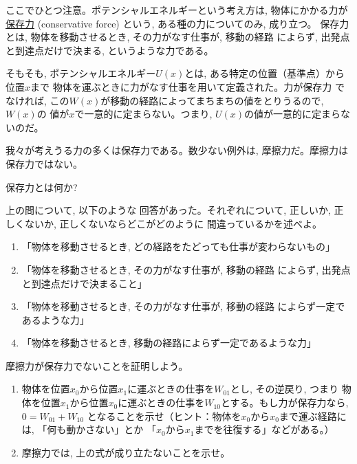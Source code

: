 ここでひとつ注意。ポテンシャルエネルギーという考え方は, 物体にかかる力が
\underline{保存力} (conservative force)
という, ある種の力についてのみ, 成り立つ。
保存力とは, 物体を移動させるとき, その力がなす仕事が, 移動の経路
によらず, 出発点と到達点だけで決まる, というような力である。

そもそも, ポテンシャルエネルギー$U(x)$とは, ある特定の位置（基準点）から位置$x$まで
物体を運ぶときに力がなす仕事を用いて定義された。力が保存力
でなければ, この$W(x)$が移動の経路によってまちまちの値をとりうるので, $W(x)$の
値が$x$で一意的に定まらない。つまり, $U(x)$の値が一意的に定まらないのだ。

我々が考えうる力の多くは保存力である。数少ない例外は, 摩擦力だ。摩擦力は保存力ではない。
\mv

%
\begin{q}\label{q:conservative_force}
保存力とは何か? 
\end{q}
\mv

\begin{q}\label{q:NewtonLaw_mistake} 上の問について, 以下のような
回答があった。それぞれについて, 正しいか, 正しくないか, 正しくないならどこがどのように
間違っているかを述べよ。
\begin{enumerate}
\item 「物体を移動させるとき, どの経路をたどっても仕事が変わらないもの」
\item 「物体を移動させるとき, その力がなす仕事が, 移動の経路
によらず, 出発点と到達点だけで決まること」
\item 「物体を移動させるとき, その力がなす仕事が, 移動の経路
によらず一定であるような力」
\item 「物体を移動させるとき, 移動の経路によらず一定であるような力」
\end{enumerate}
\end{q}


%
\begin{q}\label{q:friction_non_conservative}
摩擦力が保存力でないことを証明しよう。
\begin{enumerate}
\item 物体を位置$x_0$から位置$x_1$に運ぶときの仕事を$W_{01}$とし, その逆戻り, つまり
物体を位置$x_1$から位置$x_0$に運ぶときの仕事を$W_{10}$とする。もし力が保存力なら, 
$0=W_{01}+W_{10}$
となることを示せ（ヒント：物体を$x_0$から$x_0$まで運ぶ経路には, 「何も動かさない」とか
「$x_0$から$x_1$までを往復する」などがある。）
\item 摩擦力では, 上の式が成り立たないことを示せ。
\end{enumerate}
\end{q}
\mv

